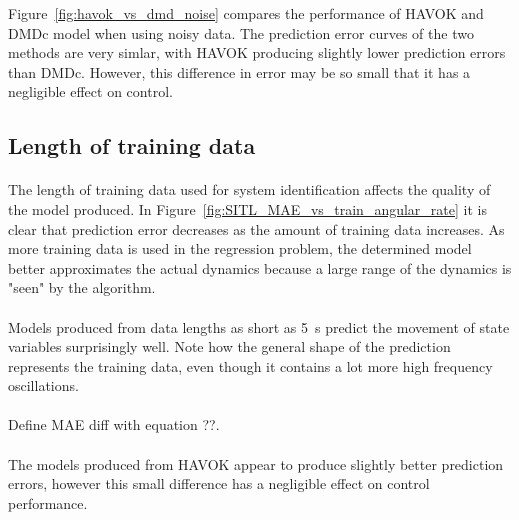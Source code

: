         

        Figure~\ref{fig:havok_vs_dmd_noise} compares the performance of HAVOK and DMDc model when using noisy data.
        The prediction error curves of the two methods are very simlar, with HAVOK producing slightly lower prediction errors than DMDc.
        However, this difference in error may be so small that it has a negligible effect on control.  

    \subsection{Length of training data}
    
        \paragraph{}
        The length of training data used for system identification affects the quality of the model produced.
        In Figure~\ref{fig:SITL_MAE_vs_train_angular_rate} it is clear that prediction error decreases as the amount of training data increases.
        As more training data is used in the regression problem, 
        the determined model better approximates the actual dynamics because a large range of the dynamics is "seen" by the algorithm.
        
        \paragraph{}
        Models produced from data lengths as short as \SI{5}{\second} predict the movement of state variables surprisingly well.
        Note how the general shape of the prediction represents the training data, 
        even though it contains a lot more high frequency oscillations.

        

        \paragraph{}
        Define MAE diff with equation ??.

        \paragraph{}
        The models produced from HAVOK appear to produce slightly better prediction errors, however this small difference has a negligible effect on control performance.

